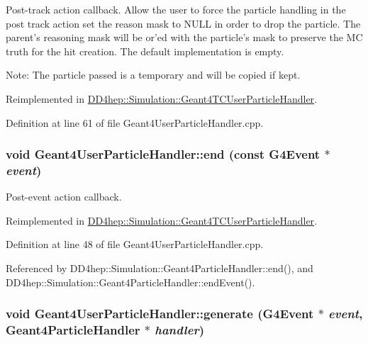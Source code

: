 Post-\/track action callback. Allow the user to force the particle handling in the post track action set the reason mask to NULL in order to drop the particle. The parent's reasoning mask will be or'ed with the particle's mask to preserve the MC truth for the hit creation. The default implementation is empty.

Note: The particle passed is a temporary and will be copied if kept. 

Reimplemented in \hyperlink{class_d_d4hep_1_1_simulation_1_1_geant4_t_c_user_particle_handler_a1578be1e99f7f70c9d332cffb1ad2504}{DD4hep::Simulation::Geant4TCUserParticleHandler}.

Definition at line 61 of file Geant4UserParticleHandler.cpp.\hypertarget{class_d_d4hep_1_1_simulation_1_1_geant4_user_particle_handler_a44c00d22c0fba91cf4a32db049728805}{
\subsubsection[{end}]{\setlength{\rightskip}{0pt plus 5cm}void Geant4UserParticleHandler::end (const G4Event $\ast$ {\em event})}}
\label{class_d_d4hep_1_1_simulation_1_1_geant4_user_particle_handler_a44c00d22c0fba91cf4a32db049728805}


Post-\/event action callback. 

Reimplemented in \hyperlink{class_d_d4hep_1_1_simulation_1_1_geant4_t_c_user_particle_handler_ac51009a6e712d2b52d2470a5a1a7a03d}{DD4hep::Simulation::Geant4TCUserParticleHandler}.

Definition at line 48 of file Geant4UserParticleHandler.cpp.

Referenced by DD4hep::Simulation::Geant4ParticleHandler::end(), and DD4hep::Simulation::Geant4ParticleHandler::endEvent().\hypertarget{class_d_d4hep_1_1_simulation_1_1_geant4_user_particle_handler_abd7d1f82639f33dd16563c4beb936c9e}{
\subsubsection[{generate}]{\setlength{\rightskip}{0pt plus 5cm}void Geant4UserParticleHandler::generate (G4Event $\ast$ {\em event}, \/  {\bf Geant4ParticleHandler} $\ast$ {\em handler})}}
\label{class_d_d4hep_1_1_simulation_1_1_geant4_user_particle_handler_abd7d1f82639f33dd16563c4beb936c9e}


